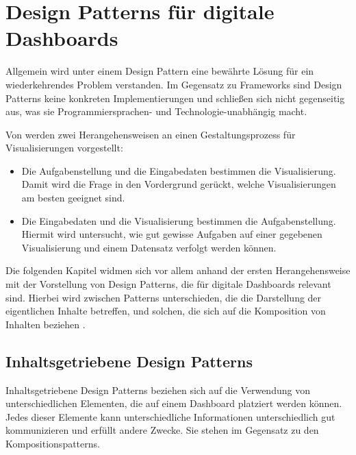 \newpage

\section{Design Patterns für digitale Dashboards}\label{sec:design-patterns-list}

Allgemein wird unter einem Design Pattern eine bewährte Lösung für ein wiederkehrendes Problem verstanden.
Im Gegensatz zu Frameworks sind Design Patterns keine konkreten Implementierungen und schließen sich nicht gegenseitig aus, was sie Programmiersprachen- und Technologie-unabhängig macht.

Von \autocite[S. 2367]{Schulz.DesignSpaceVisualizationTasks.2013} werden zwei Herangehensweisen an einen Gestaltungsprozess für Visualisierungen vorgestellt:

\begin{itemize}
    \item Die Aufgabenstellung und die Eingabedaten bestimmen die Visualisierung.
    Damit wird die Frage in den Vordergrund gerückt, welche Visualisierungen am besten geeignet sind.
    \item Die Eingabedaten und die Visualisierung bestimmen die Aufgabenstellung.
    Hiermit wird untersucht, wie gut gewisse Aufgaben auf einer gegebenen Visualisierung und einem Datensatz verfolgt werden können.
\end{itemize}

Die folgenden Kapitel widmen sich vor allem anhand der ersten Herangehensweise mit der Vorstellung von Design Patterns, die für digitale Dashboards relevant sind.
Hierbei wird zwischen Patterns unterschieden, die die Darstellung der eigentlichen Inhalte betreffen, und solchen, die sich auf die Komposition von Inhalten beziehen \autocite[S. 3--5]{Bach.DashboardDesignPatterns.2023}.


\subsection{Inhaltsgetriebene Design Patterns}\label{subsec:content-design-patterns}

Inhaltsgetriebene Design Patterns beziehen sich auf die Verwendung von unterschiedlichen Elementen, die auf einem Dashboard platziert werden können.
Jedes dieser Elemente kann unterschiedliche Informationen unterschiedlich gut kommunizieren und erfüllt andere Zwecke.
Sie stehen im Gegensatz zu den Kompositionspatterns.

